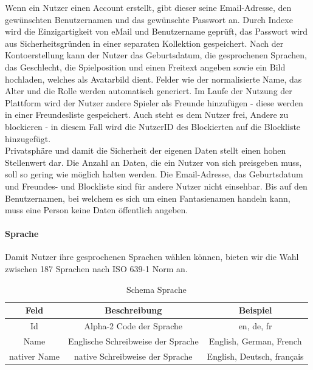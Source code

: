 Wenn ein Nutzer einen Account erstellt, gibt dieser seine Email-Adresse, den gewünschten Benutzernamen und das gewünschte Passwort an. 
Durch Indexe wird die Einzigartigkeit von eMail und Benutzername geprüft, das Passwort wird aus Sicherheitsgründen in einer separaten Kollektion gespeichert.
Nach der Kontoerstellung kann der Nutzer das Geburtsdatum, die gesprochenen Sprachen, das Geschlecht, die Spielposition und einen Freitext angeben sowie ein Bild hochladen, welches als Avatarbild dient.
Felder wie der normalisierte Name, das Alter und die Rolle werden automatisch generiert.
Im Laufe der Nutzung der Plattform wird der Nutzer andere Spieler als Freunde hinzufügen - diese werden in einer Freundesliste gespeichert.
Auch steht es dem Nutzer frei, Andere zu blockieren - in diesem Fall wird die NutzerID des Blockierten auf die Blockliste hinzugefügt. \\
Privatsphäre und damit die Sicherheit der eigenen Daten stellt einen hohen Stellenwert dar.
Die Anzahl an Daten, die ein Nutzer von sich preisgeben muss, soll so gering wie möglich halten werden.
Die Email-Adresse, das Geburtsdatum und Freundes- und Blockliste sind für andere Nutzer nicht einsehbar.
Bis auf den Benutzernamen, bei welchem es sich um einen Fantasienamen handeln kann, muss eine Person keine Daten öffentlich angeben.

\paragraph{Sprache\\}
Damit Nutzer ihre gesprochenen Sprachen wählen können, bieten wir die Wahl zwischen 187 Sprachen nach ISO 639-1 Norm an.\cite{db:iso639-1}\\

\begin{table}
    \centering
    \begin{tabular}{ |c|c|c| }
    \hline
        Feld & Beschreibung & Beispiel \\
        \hline
        Id & Alpha-2 Code der Sprache & en, de, fr \\
        Name & Englische Schreibweise der Sprache & English, German, French \\
        nativer Name & native Schreibweise der Sprache & English, Deutsch, français \\
        \hline
    \end{tabular}
    \caption{Schema Sprache}
    \label{db:table:sprache}
\end{table}

